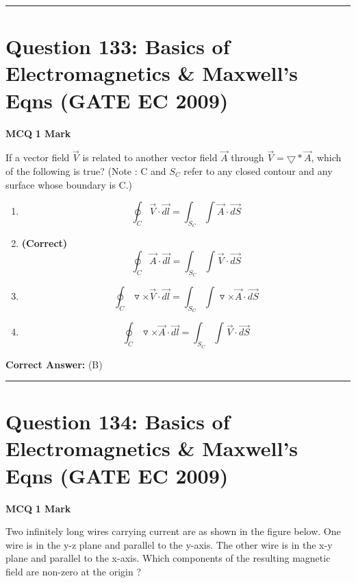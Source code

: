 \documentclass[11pt,a4paper]{article}
\begin{document}
\vspace{1.5em}
\hrule
\vspace{1.5em}

\section*{Question 133: Basics of Electromagnetics \& Maxwell's Eqns (GATE EC 2009)}
\noindent \textbf{\color{primary}MCQ} \hfill \textbf{\color{secondary}1 Mark}


\noindent If a vector field $\vec{V}$ is related to another vector field $\vec{A}$ through $\vec{V}=\bigtriangledown *\vec{A}$, which of the following is true? (Note : C and $S_C$ refer to any closed contour and any surface whose boundary is C.)


\begin{enumerate}[label=(\Alph*)]
    \item \[
\oint_{C}^{}\vec{V} \cdot \vec{dl}=\int_{S_{C}}^{} \int_{}^{}\vec{A}\cdot \vec{dS}
\]
    \item \textbf{(Correct)} \[
\oint_{C}^{}\vec{A} \cdot \vec{dl}=\int_{S_{C}}^{} \int_{}^{}\vec{V}\cdot \vec{dS}
\]
    \item \[
\oint_{C}^{}\triangledown \times \vec{V} \cdot \vec{dl}=\int_{S_{C}}^{} \int_{}^{}\triangledown \times \vec{A}\cdot \vec{dS}
\]
    \item \[
\oint_{C}^{}\triangledown \times \vec{A} \cdot \vec{dl}=\int_{S_{C}}^{} \int_{}^{}\vec{V}\cdot \vec{dS}
\]
\end{enumerate}

\noindent \textbf{Correct Answer:} (B)


\vspace{1.5em}
\hrule
\vspace{1.5em}

\section*{Question 134: Basics of Electromagnetics \& Maxwell's Eqns (GATE EC 2009)}
\noindent \textbf{\color{primary}MCQ} \hfill \textbf{\color{secondary}1 Mark}


\noindent Two infinitely long wires carrying current are as shown in the figure below. One wire is in the y-z plane and parallel to the y-axis. The other wire is in the x-y plane and parallel to the x-axis. Which components of the resulting magnetic field are non-zero at the origin ? 
\end{document}
